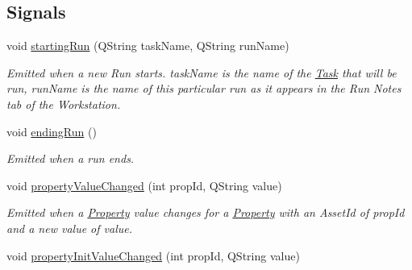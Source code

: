 \subsection*{Signals}
\begin{DoxyCompactItemize}
\item 
\hypertarget{class_picto_1_1_state_updater_ad1590a017d6f7c51e8086a3fd7a2b25b}{void \hyperlink{class_picto_1_1_state_updater_ad1590a017d6f7c51e8086a3fd7a2b25b}{starting\-Run} (Q\-String task\-Name, Q\-String run\-Name)}\label{class_picto_1_1_state_updater_ad1590a017d6f7c51e8086a3fd7a2b25b}

\begin{DoxyCompactList}\small\item\em Emitted when a new Run starts. task\-Name is the name of the \hyperlink{class_picto_1_1_task}{Task} that will be run, run\-Name is the name of this particular run as it appears in the Run Notes tab of the Workstation. \end{DoxyCompactList}\item 
\hypertarget{class_picto_1_1_state_updater_aab58fbf8e6a585e06b8dfe6dbf15415f}{void \hyperlink{class_picto_1_1_state_updater_aab58fbf8e6a585e06b8dfe6dbf15415f}{ending\-Run} ()}\label{class_picto_1_1_state_updater_aab58fbf8e6a585e06b8dfe6dbf15415f}

\begin{DoxyCompactList}\small\item\em Emitted when a run ends. \end{DoxyCompactList}\item 
\hypertarget{class_picto_1_1_state_updater_a59e5c0981f0109047c3fbd5a3600d1ba}{void \hyperlink{class_picto_1_1_state_updater_a59e5c0981f0109047c3fbd5a3600d1ba}{property\-Value\-Changed} (int prop\-Id, Q\-String value)}\label{class_picto_1_1_state_updater_a59e5c0981f0109047c3fbd5a3600d1ba}

\begin{DoxyCompactList}\small\item\em Emitted when a \hyperlink{class_picto_1_1_property}{Property} value changes for a \hyperlink{class_picto_1_1_property}{Property} with an Asset\-Id of prop\-Id and a new value of value. \end{DoxyCompactList}\item 
\hypertarget{class_picto_1_1_state_updater_a8845b2700917283f18792ba2fa32a877}{void \hyperlink{class_picto_1_1_state_updater_a8845b2700917283f18792ba2fa32a877}{property\-Init\-Value\-Changed} (int prop\-Id, Q\-String value)}\label{class_picto_1_1_state_updater_a8845b2700917283f18792ba2fa32a877}


\end{DoxyCompactItemize}
